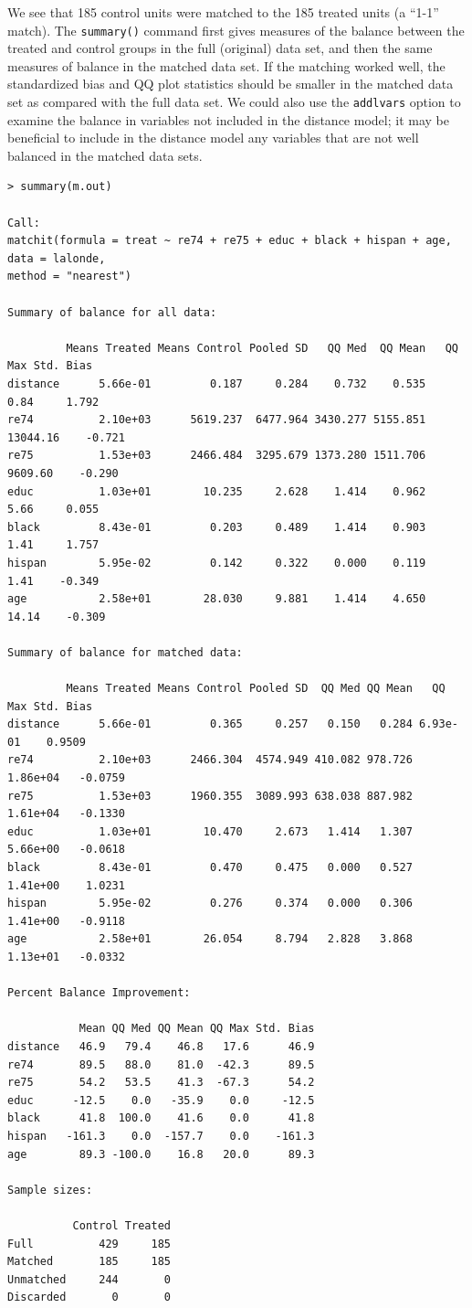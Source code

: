 \documentclass[oneside,letterpaper,titlepage]{article}
\begin{document}
We see that 185 control units were matched to the 185 treated units (a
``1-1'' match).  The \texttt{summary()} command first gives measures
of the balance between the treated and control groups in the full
(original) data set, and then the same measures of balance in the
matched data set.  If the matching worked well, the standardized bias
and QQ plot statistics should be smaller in the matched data set as
compared with the full data set.  We could also use the
\texttt{addlvars} option to examine the balance in variables not
included in the distance model; it may be beneficial to include in the
distance model any variables that are not well balanced in the matched
data sets.
\begin{verbatim}
> summary(m.out)

Call:
matchit(formula = treat ~ re74 + re75 + educ + black + hispan + age, data = lalonde, 
method = "nearest")

Summary of balance for all data:

         Means Treated Means Control Pooled SD   QQ Med  QQ Mean   QQ Max Std. Bias
distance      5.66e-01         0.187     0.284    0.732    0.535     0.84     1.792 
re74          2.10e+03      5619.237  6477.964 3430.277 5155.851 13044.16    -0.721
re75          1.53e+03      2466.484  3295.679 1373.280 1511.706  9609.60    -0.290
educ          1.03e+01        10.235     2.628    1.414    0.962     5.66     0.055
black         8.43e-01         0.203     0.489    1.414    0.903     1.41     1.757
hispan        5.95e-02         0.142     0.322    0.000    0.119     1.41    -0.349
age           2.58e+01        28.030     9.881    1.414    4.650    14.14    -0.309
        
Summary of balance for matched data:

         Means Treated Means Control Pooled SD  QQ Med QQ Mean   QQ Max Std. Bias
distance      5.66e-01         0.365     0.257   0.150   0.284 6.93e-01    0.9509
re74          2.10e+03      2466.304  4574.949 410.082 978.726 1.86e+04   -0.0759
re75          1.53e+03      1960.355  3089.993 638.038 887.982 1.61e+04   -0.1330
educ          1.03e+01        10.470     2.673   1.414   1.307 5.66e+00   -0.0618
black         8.43e-01         0.470     0.475   0.000   0.527 1.41e+00    1.0231
hispan        5.95e-02         0.276     0.374   0.000   0.306 1.41e+00   -0.9118
age           2.58e+01        26.054     8.794   2.828   3.868 1.13e+01   -0.0332
        
Percent Balance Improvement:

           Mean QQ Med QQ Mean QQ Max Std. Bias
distance   46.9   79.4    46.8   17.6      46.9
re74       89.5   88.0    81.0  -42.3      89.5
re75       54.2   53.5    41.3  -67.3      54.2
educ      -12.5    0.0   -35.9    0.0     -12.5
black      41.8  100.0    41.6    0.0      41.8
hispan   -161.3    0.0  -157.7    0.0    -161.3
age        89.3 -100.0    16.8   20.0      89.3

Sample sizes:

          Control Treated
Full          429     185
Matched       185     185
Unmatched     244       0
Discarded       0       0
\end{verbatim}
\end{document}
